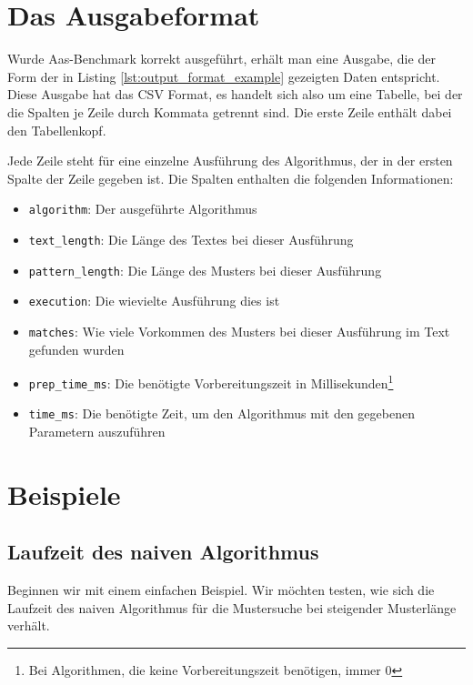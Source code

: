 \documentclass[twocolumn]{article}
\begin{document}
\section{Das Ausgabeformat}

Wurde Aas-Benchmark korrekt ausgeführt, erhält man eine Ausgabe, die der Form der in Listing \ref{lst:output_format_example} gezeigten Daten entspricht. Diese Ausgabe hat das CSV Format, es handelt sich also um eine Tabelle, bei der die Spalten je Zeile durch Kommata getrennt sind. Die erste Zeile enthält dabei den Tabellenkopf.

Jede Zeile steht für eine einzelne Ausführung des Algorithmus, der in der ersten Spalte der Zeile gegeben ist. Die Spalten enthalten die folgenden Informationen:

\begin{itemize}
    \item \texttt{algorithm}: Der ausgeführte Algorithmus
    \item \texttt{text\_length}: Die Länge des Textes bei dieser Ausführung
    \item \texttt{pattern\_length}: Die Länge des Musters bei dieser Ausführung
    \item \texttt{execution}: Die wievielte Ausführung dies ist
    \item \texttt{matches}: Wie viele Vorkommen des Musters bei dieser Ausführung im Text gefunden wurden
    \item \texttt{prep\_time\_ms}: Die benötigte Vorbereitungszeit in Millisekunden\footnote{Bei Algorithmen, die keine Vorbereitungszeit benötigen, immer 0}
    \item \texttt{time\_ms}: Die benötigte Zeit, um den Algorithmus mit den gegebenen Parametern auszuführen
\end{itemize}



\section{Beispiele}

\subsection*{Laufzeit des naiven Algorithmus}

Beginnen wir mit einem einfachen Beispiel. Wir möchten testen, wie sich die Laufzeit des naiven Algorithmus für die Mustersuche bei steigender Musterlänge verhält.
\end{document}
